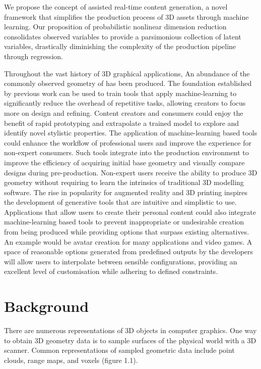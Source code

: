 \documentclass[a4paper, fontsize=15pt, onecolumn]{article} %
\numberwithin{equation}{section} %
\numberwithin{figure}{section} %
\numberwithin{table}{section} %
\begin{document}
We propose the concept of assisted real-time content generation, a novel framework that simplifies the production process of 3D assets through machine learning. Our proposition of probabilistic nonlinear dimension reduction consolidates observed variables to provide a parsimonious collection of latent variables, drastically diminishing the complexity of the production pipeline through regression.

Throughout the vast history of 3D graphical applications, An abundance of the commonly observed geometry of has been produced. The foundation established by previous work can be used to train tools that apply machine-learning to significantly reduce the overhead of repetitive tasks, allowing creators to focus more on design and refining. Content creators and consumers could enjoy the benefit of rapid prototyping and extrapolate a trained model to explore and identify novel stylistic properties.
The application of machine-learning based tools could enhance the workflow of professional users and improve the experience for non-expert consumers. Such tools integrate into the production environment to improve the efficiency of acquiring initial base geometry and visually compare designs during pre-production. Non-expert users receive the ability to produce 3D geometry without requiring to learn the intrinsics of traditional 3D modelling software. The rise in popularity for augmented reality and 3D printing inspires the development of generative tools that are intuitive and simplistic to use. Applications that allow users to create their personal content could also integrate machine-learning based tools to prevent inappropriate or undesirable creation from being produced while providing options that surpass existing alternatives. An example would be avatar creation for many applications and video games. A space of reasonable options generated from predefined outputs by the developers will allow users to interpolate between sensible configurations, providing an excellent level of customisation while adhering to defined constraints.

\section{Background}
There are numerous representations of 3D objects in computer graphics. One way to obtain 3D geometry data is to sample surfaces of the physical world with a 3D scanner. Common representations of sampled geometric data include point clouds, range maps, and voxels (figure 1.1).
\end{document}
